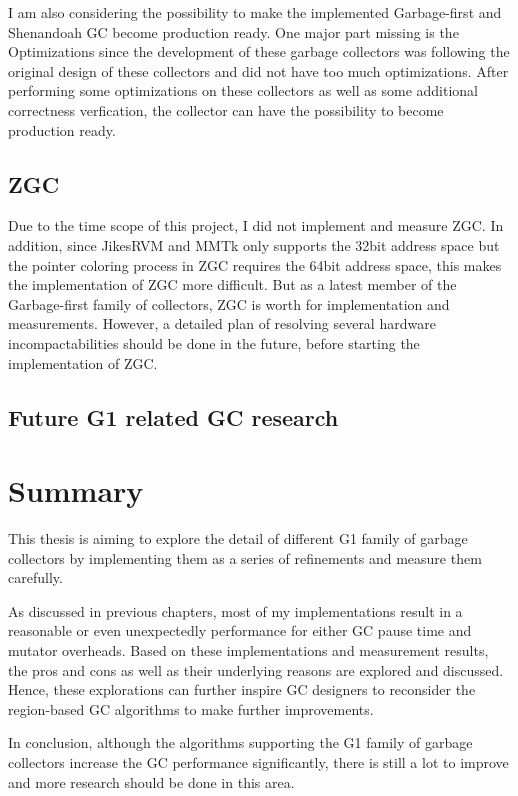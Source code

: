 I am also considering the possibility to make the implemented Garbage-first
and Shenandoah GC become production ready. One major part missing is the Optimizations
since the development of these garbage collectors was following the original design
of these collectors and did not have too much optimizations. After performing some
optimizations on these collectors as well as some additional correctness verfication,
the collector can have the possibility to become production ready.

\subsection{ZGC}

Due to the time scope of this project, I did not implement and measure ZGC.
In addition, since JikesRVM and MMTk only supports the 32bit address space but the pointer
coloring process in ZGC requires the 64bit address space, this makes the implementation
of ZGC more difficult.
But as a latest member of the Garbage-first family of collectors, ZGC is
worth for implementation and measurements.
However, a detailed plan of resolving several hardware incompactabilities should be done in the future,
before starting the implementation of ZGC.

\subsection{Future G1 related GC research}



\section{Summary}

This thesis is aiming to explore the detail of different G1 family of garbage collectors
by implementing them as a series of refinements and measure them carefully.

As discussed in previous chapters, most of my implementations result in a reasonable
or even unexpectedly performance for either GC pause time and mutator overheads.
Based on these implementations and measurement results, the pros and cons as well
as their underlying reasons are explored and discussed. Hence, these explorations can
further inspire GC designers to reconsider the region-based GC algorithms to make
further improvements.

In conclusion, although the algorithms supporting the G1 family of garbage collectors
increase the GC performance significantly, there is still a lot to improve and more research
should be done in this area.





